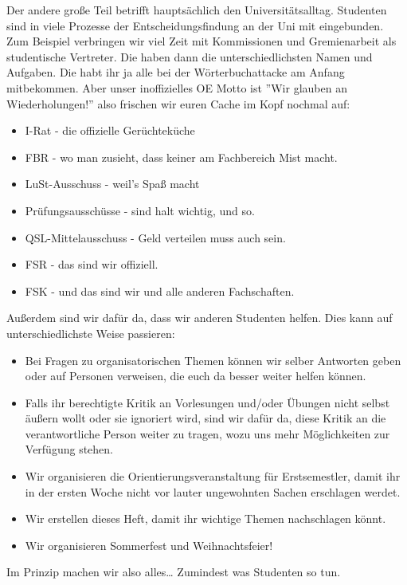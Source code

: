     Der andere große Teil betrifft hauptsächlich den Universitätsalltag.
    Studenten sind in viele Prozesse der Entscheidungsfindung an der Uni
    mit eingebunden.
    Zum Beispiel verbringen wir viel Zeit mit Kommissionen und Gremienarbeit als studentische Vertreter.
    Die haben dann die unterschiedlichsten Namen und Aufgaben.
    Die habt ihr ja alle bei der W\"orterbuchattacke am Anfang mitbekommen.
    Aber unser inoffizielles OE Motto ist ''Wir glauben an Wiederholungen!'' also frischen wir euren Cache im Kopf nochmal auf:
    \begin{itemize}
        \item I-Rat - die offizielle Ger\"uchtek\"uche
        \item FBR - wo man zusieht, dass keiner am Fachbereich Mist macht.
        \item LuSt-Ausschuss - weil's Spa{\ss} macht
        \item Prüfungsausschüsse - sind halt wichtig, und so.
        \item QSL-Mittelausschuss - Geld verteilen muss auch sein.
        \item FSR - das sind wir offiziell.
        \item FSK - und das sind wir und alle anderen Fachschaften.
    \end{itemize}
    Au{\ss}erdem sind wir daf\"ur da, dass wir anderen Studenten helfen. Dies kann auf unterschiedlichste Weise passieren:
    \begin{itemize}
        \item Bei Fragen zu organisatorischen Themen können wir selber Antworten geben oder auf Personen verweisen, die euch da besser weiter helfen können.
        \item Falls ihr berechtigte Kritik an Vorlesungen und/oder Übungen nicht selbst äußern wollt oder sie ignoriert wird, sind wir dafür da, diese Kritik an die verantwortliche Person weiter zu tragen, wozu uns mehr Möglichkeiten zur Verfügung stehen.
        \item Wir organisieren die Orientierungsveranstaltung für Erstsemestler, damit ihr in der ersten Woche nicht vor lauter ungewohnten Sachen erschlagen werdet.
        \item Wir erstellen dieses Heft, damit ihr wichtige Themen nachschlagen könnt.
        \item Wir organisieren Sommerfest und Weihnachtsfeier!
    \end{itemize}
    Im Prinzip machen wir also alles\dots\hspace{1cm} Zumindest was Studenten so tun.




